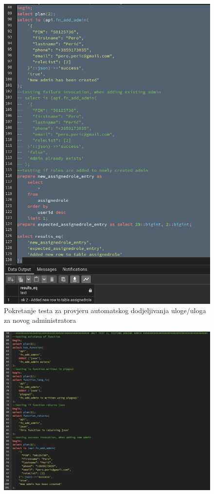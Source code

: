 				\begin{figure}[H]
					\centering
					\includegraphics[width=\textwidth]{slike/unit_tests/ut_2/role_assigned.png}
					\caption{Pokretanje testa za provjeru automatskog dodjeljivanja uloge/uloga za novog administratora}
					\label{fig: IS2-dodavanje uloga novom adminstratoru}
				\end{figure}
				\begin{figure}[H]
					\centering
					\includegraphics[width=\textwidth]{slike/unit_tests/ut_2/code_part1.png}
					\label{fig: IS2-code part 1}
				\end{figure}
